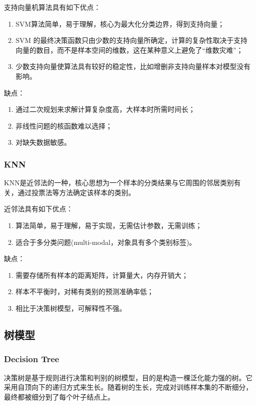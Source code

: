 \documentclass[UTF8]{ctexart}
\begin{document}
支持向量机算法具有如下优点：
\begin{enumerate}[(1)]
	\item SVM算法简单，易于理解，核心为最大化分类边界，得到支持向量；
	\item SVM 的最终决策函数只由少数的支持向量所确定，计算的复杂性取决于支持向量的数目，而不是样本空间的维数，这在某种意义上避免了“维数灾难”；
	\item 少数支持向量使算法具有较好的稳定性，比如增删非支持向量样本对模型没有影响。
\end{enumerate}

缺点：
\begin{enumerate}[(1)]
	\item 通过二次规划来求解计算复杂度高，大样本时所需时间长；
	\item 非线性问题的核函数难以选择；
	\item 对缺失数据敏感。
\end{enumerate}


\subsubsection{KNN}
KNN是近邻法的一种，核心思想为一个样本的分类结果与它周围的邻居类别有关，通过投票法等方法确定该样本的类别。

近邻法具有如下优点：
\begin{enumerate}[(1)]
	\item 算法简单，易于理解，易于实现，无需估计参数，无需训练；
	\item 适合于多分类问题(multi-modal，对象具有多个类别标签)。
\end{enumerate}

缺点：
\begin{enumerate}[(1)]
	\item 需要存储所有样本的距离矩阵，计算量大，内存开销大；
	\item 样本不平衡时，对稀有类别的预测准确率低；
	\item 相比于决策树模型，可解释性不强。
\end{enumerate}


\subsection{树模型}

\subsubsection{Decision Tree}
决策树是基于规则进行决策和判别的树模型，目的是构造一棵泛化能力强的树。它采用自顶向下的递归方式来生长。随着树的生长，完成对训练样本集的不断细分，最终都被细分到了每个叶子结点上。
\end{document}
